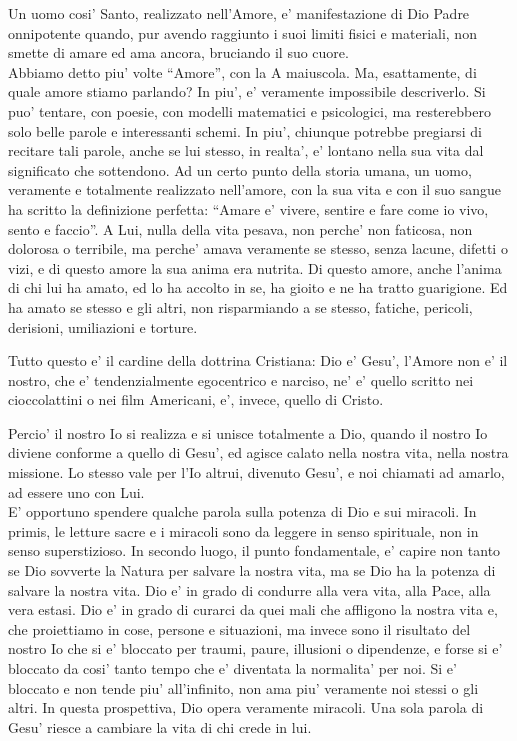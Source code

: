 Un uomo cosi' Santo, realizzato nell'Amore, e' manifestazione di Dio Padre onnipotente quando, pur avendo raggiunto i suoi limiti fisici e materiali, non smette di amare ed ama ancora, bruciando il suo cuore. \\

Abbiamo detto piu' volte ``Amore'', con la A maiuscola. Ma, esattamente, di quale amore stiamo parlando? In piu', e' veramente impossibile descriverlo. Si puo' tentare, con poesie, con modelli matematici e psicologici, ma resterebbero solo belle parole e interessanti schemi. In piu', chiunque potrebbe pregiarsi di recitare tali parole, anche se lui stesso, in realta', e' lontano nella sua vita dal significato che sottendono. Ad un certo punto della storia umana, un uomo, veramente e totalmente realizzato nell'amore, con la sua vita e con il suo sangue ha scritto la definizione perfetta: ``Amare e' vivere, sentire e fare come io vivo, sento e faccio''.
A Lui, nulla della vita pesava, non perche' non faticosa, non dolorosa o terribile, ma perche' amava veramente se stesso, senza lacune, difetti o vizi, e di questo amore la sua anima era nutrita. Di questo amore, anche l'anima di chi lui ha amato, ed lo ha accolto in se, ha gioito e ne ha tratto guarigione.
Ed ha amato se stesso e gli altri, non risparmiando a se stesso, fatiche, pericoli, derisioni, umiliazioni e torture.

Tutto questo e' il cardine della dottrina Cristiana: Dio e' Gesu', l'Amore non e' il nostro, che e' tendenzialmente egocentrico e narciso, ne' e' quello scritto nei cioccolattini o nei film Americani, e', invece, quello di Cristo.

Percio' il nostro Io si realizza e si unisce totalmente a Dio, quando il nostro Io diviene conforme a quello di Gesu', ed agisce calato nella nostra vita, nella nostra missione.
Lo stesso vale per l'Io altrui, divenuto Gesu', e noi chiamati ad amarlo, ad essere uno con Lui.\\

E' opportuno spendere qualche parola sulla potenza di Dio e sui miracoli. In primis, le letture sacre e i miracoli sono da leggere in senso spirituale, non in senso superstizioso. In secondo luogo, il punto fondamentale, e' capire non tanto se Dio sovverte la Natura per salvare la nostra vita, ma se Dio ha la potenza di salvare la nostra vita. Dio e' in grado di condurre alla vera vita, alla Pace, alla vera estasi. Dio e' in grado di curarci da quei mali che affligono la nostra vita e, che proiettiamo in cose, persone e situazioni, ma invece sono il risultato del nostro Io che si e' bloccato per traumi, paure, illusioni o dipendenze, e forse si e' bloccato da cosi' tanto tempo che e' diventata la normalita' per noi. Si e' bloccato e non tende piu' all'infinito, non ama piu' veramente noi stessi o gli altri. In questa prospettiva, Dio opera veramente miracoli. Una sola parola di Gesu' riesce a cambiare la vita di chi crede in lui.
 

